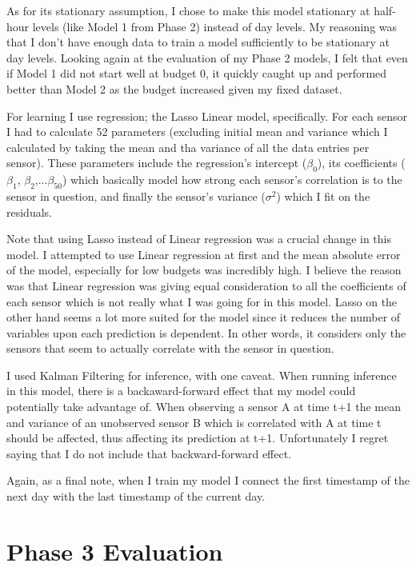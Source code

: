 \documentclass{article}
\begin{document}
As for its stationary assumption, I chose to
make this model stationary at half-hour levels
(like Model 1 from Phase 2) instead of day
levels. My reasoning was that I don't have
enough data to train a model sufficiently to
be stationary at day levels. Looking again at
the evaluation of my Phase 2 models, I felt
that even if Model 1 did not start well at
budget 0, it quickly caught up and performed
better than Model 2 as the budget increased
given my fixed dataset.

For learning I use regression; the Lasso Linear
model, specifically. For each sensor I had to calculate
52 parameters (excluding initial mean and variance which
I calculated by taking the mean and tha variance of all
the data entries per sensor). These parameters include
the regression's intercept ($\beta_0$), its
coefficients ($\beta_1$, $\beta_2$,...$\beta_{50}$) which
basically model how strong each sensor's correlation is
to the sensor in question, and finally the sensor's
variance ($\sigma^2$) which I fit on the residuals.

Note that using Lasso instead of Linear regression was
a crucial change in this model. I attempted to use
Linear regression at first and the mean absolute error
of the model, especially for low budgets was incredibly
high. I believe the reason was that Linear regression
was giving equal consideration to all the coefficients
of each sensor which is not really what I was going for
in this model. Lasso on the other hand seems a lot more
suited for the model since it reduces the number of
variables upon each prediction is dependent. In other
words, it considers only the sensors that seem to
actually correlate with the sensor in question.

I used Kalman Filtering for inference, with one caveat.
When running inference in this model, there is a
backaward-forward effect that my model could potentially
take advantage of. When observing a sensor A at time t+1
the mean and variance of an unobserved sensor B which is
correlated with A at time t should be affected, thus
affecting its prediction at t+1. Unfortunately I regret
saying that I do not include that backward-forward effect.

Again, as a final note, when I train my model I connect
the first timestamp of the next day with the last timestamp
of the current day.

\section{Phase 3 Evaluation}
\end{document}
